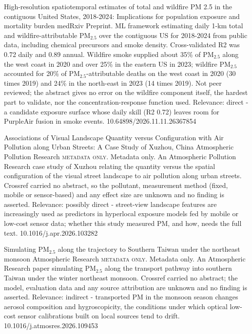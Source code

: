 \documentclass[10pt]{article}
\begin{document}
\par{}\baselineskip{}\baselineskip
{}

{High-resolution spatiotemporal estimates of total and wildfire PM 2.5 in the contiguous United States, 2018-2024: Implications for population exposure and mortality burden}
{medRxiv}
{Preprint. ML framework estimating daily 1-km total and wildfire-attributable PM$_{2.5}$ over the contiguous US for 2018-2024 from public data, including chemical precursors and smoke density. Cross-validated R2 was 0.72 daily and 0.89 annual. Wildfire smoke supplied about 35\% of PM$_{2.5}$ along the west coast in 2020 and over 25\% in the eastern US in 2023; wildfire PM$_{2.5}$ accounted for 20\% of PM$_{2.5}$-attributable deaths on the west coast in 2020 (30 times 2019) and 24\% in the north-east in 2023 (14 times 2019). Not peer reviewed; the abstract gives no error on the wildfire component itself, the hardest part to validate, nor the concentration-response function used. Relevance: direct - a candidate exposure surface whose daily skill (R2 0.72) leaves room for PurpleAir fusion in smoke events.}
{10.64898/2026.11.11.26367854}

{Associations of Visual Landscape Quantity versus Configuration with Air Pollution along Urban Streets: A Case Study of Xuzhou, China}
{Atmospheric Pollution Research}
{\textsc{metadata only.} Metadata only. An Atmospheric Pollution Research case study of Xuzhou relating the quantity versus the spatial configuration of the visual street landscape to air pollution along urban streets. Crossref carried no abstract, so the pollutant, measurement method (fixed, mobile or sensor-based) and any effect size are unknown and no finding is asserted. Relevance: possibly direct - street-view landscape features are increasingly used as predictors in hyperlocal exposure models fed by mobile or low-cost sensor data; whether this study measured PM, and how, needs the full text.}
{10.1016/j.apr.2026.103282}

{Simulating PM$_{2.5}$ along the trajectory to Southern Taiwan under the northeast monsoon}
{Atmospheric Research}
{\textsc{metadata only.} Metadata only. An Atmospheric Research paper simulating PM$_{2.5}$ along the transport pathway into southern Taiwan under the winter northeast monsoon. Crossref carried no abstract; the model, evaluation data and any source attribution are unknown and no finding is asserted. Relevance: indirect - transported PM in the monsoon season changes aerosol composition and hygroscopicity, the conditions under which optical low-cost sensor calibrations built on local sources tend to drift.}
{10.1016/j.atmosres.2026.109453}
\end{document}

